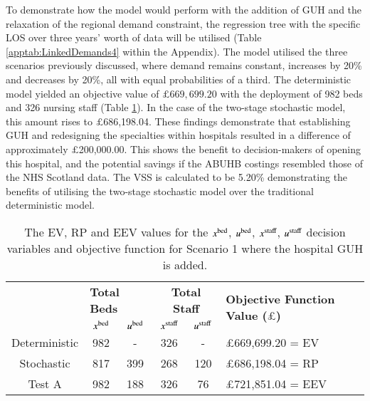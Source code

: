 \documentclass[../thesis.tex]{subfiles}
\begin{document}
To demonstrate how the model would perform with the addition of GUH and the relaxation of the regional demand constraint, the regression tree with the specific LOS over three years' worth of data will be utilised (Table \ref{apptab:LinkedDemands4} within the Appendix). The model utilised the three scenarios previously discussed, where demand remains constant, increases by 20\% and decreases by 20\%, all with equal probabilities of a third. The deterministic model yielded an objective value of $\pounds669,699.20$ with the deployment of 982 beds and 326 nursing staff (Table \ref{tab:Scenario1Results}). In the case of the two-stage stochastic model, this amount rises to $\pounds$686,198.04. These findings demonstrate that establishing GUH and redesigning the specialties within hospitals resulted in a difference of approximately $\pounds$200,000.00. This shows the benefit to decision-makers of opening this hospital, and the potential savings if the ABUHB costings resembled those of the NHS Scotland data. The VSS is calculated to be 5.20\% demonstrating the benefits of utilising the two-stage stochastic model over the traditional deterministic model.

\begin{table}[h!]
    \centering
    \begin{tabular}{cccccl}\toprule
 & \multicolumn{2}{l}{\textbf{Total Beds}} & \multicolumn{2}{c}{\textbf{Total Staff}} & \multirow{2}{*}{\textbf{Objective Function Value ($\pounds$)}}\\ \cmidrule(lr){2-3} \cmidrule(lr){4-5}
          & $x^\textnormal{bed}$           & $u^\textnormal{bed}$          & $x^\textnormal{staff}$         & $u^\textnormal{staff}$         \\ \midrule
 Deterministic & 982 & - & 326 & - & $\pounds$669,699.20 = EV \\
 Stochastic & 817 & 399 & 268 & 120 & $\pounds$686,198.04 = RP \\
 Test A & 982 & 188 & 326 & 76  & $\pounds$721,851.04 = EEV \\\bottomrule
    \end{tabular}
    \caption{The EV, RP and EEV values for the $x^\textnormal{bed}$, $u^\textnormal{bed}$, $x^\textnormal{staff}$, $u^\textnormal{staff}$ decision variables and objective function for Scenario 1 where the hospital GUH is added.}
    \label{tab:Scenario1Results}
\end{table}
\end{document}
